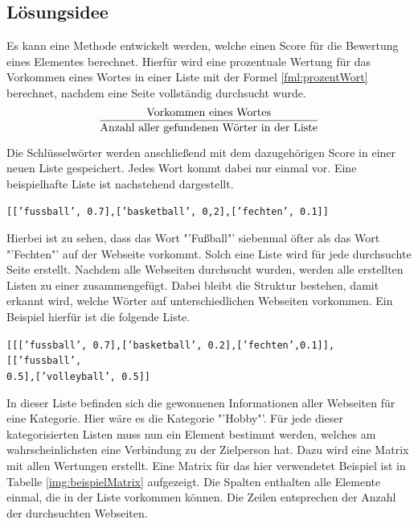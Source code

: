 	\subsection{Lösungsidee}
	Es kann eine Methode entwickelt werden, welche einen Score für die Bewertung eines Elementes berechnet. Hierfür wird eine prozentuale Wertung für das Vorkommen eines Wortes in einer Liste mit der Formel \ref{fml:prozentWort} berechnet, nachdem eine Seite vollständig durchsucht wurde.
	\begin{align}%
	\label{fml:prozentWort}
	\begin{split}%
	&\frac{\text{Vorkommen eines Wortes}}{\text{Anzahl aller gefundenen Wörter in der Liste}}\\[0.25\baselineskip]%
	\end{split}
	\end{align}
	Die Schlüsselwörter werden anschließend mit dem dazugehörigen Score in einer neuen Liste gespeichert. Jedes Wort kommt dabei nur einmal vor. Eine beispielhafte Liste ist nachstehend dargestellt.
	
	\texttt{[['fussball', 0.7],['basketball', 0,2],['fechten', 0.1]]}
	
	Hierbei ist zu sehen, dass das Wort "'Fußball"' siebenmal öfter als das Wort "'Fechten"' auf der Webseite vorkommt. Solch eine Liste wird für jede durchsuchte Seite erstellt. Nachdem alle Webseiten durchsucht wurden, werden alle erstellten Listen zu einer zusammengefügt. Dabei bleibt die Struktur bestehen, damit erkannt wird, welche Wörter auf unterschiedlichen Webseiten vorkommen. Ein Beispiel hierfür ist die folgende Liste.
	
	\texttt{[[['fussball', 0.7],['basketball', 0.2],['fechten',0.1]],
		[['fussball',\\ 0.5],['volleyball', 0.5]]}
	
	In dieser Liste befinden sich die gewonnenen Informationen aller Webseiten für eine Kategorie. Hier wäre es die Kategorie "'Hobby"'. Für jede dieser kategorisierten Listen muss nun ein Element bestimmt werden, welches am wahrscheinlichsten eine Verbindung zu der Zielperson hat. Dazu wird eine Matrix mit allen Wertungen erstellt. Eine Matrix für das hier verwendetet Beispiel ist in Tabelle \ref{img:beispielMatrix} aufgezeigt. Die Spalten enthalten alle Elemente einmal, die in der Liste vorkommen können. Die Zeilen entsprechen der Anzahl der durchsuchten Webseiten. 
	
